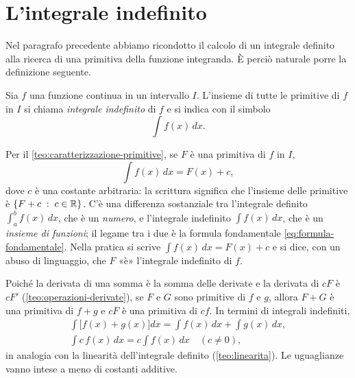 \section{L'integrale indefinito}
\label{sec:integrale-indefinito}

Nel paragrafo precedente abbiamo ricondotto il calcolo di un integrale definito alla
ricerca di una primitiva della funzione integranda. È perciò naturale porre la
definizione seguente.

\begin{definizione}\label{def:integrale-indefinito}
Sia $f$ una funzione continua in un intervallo $I$. L'insieme di tutte le primitive di
$f$ in $I$ si chiama \emph{integrale indefinito} di $f$ e si indica con il simbolo
\begin{equation}\label{eq:integrale-indefinito}
  \int f(x)\,dx .
\end{equation}
\end{definizione}

Per il \cref{teo:caratterizzazione-primitive}, se $F$ è una primitiva di $f$ in $I$,
\begin{equation}\label{eq:integrale-indefinito-c}
  \int f(x)\,dx=F(x)+c ,
\end{equation}
dove $c$ è una costante arbitraria: la scrittura significa che l'insieme delle
primitive è $\left\{ F+c \;:\; c\in\mathbb{R} \right\}$. C'è una differenza sostanziale tra l'integrale
definito $\int_{a}^{b}f(x)\,dx$, che è un \emph{numero}, e l'integrale indefinito $\int f(x)\,dx$,
che è un \emph{insieme di funzioni}; il legame tra i due è la formula fondamentale
\eqref{eq:formula-fondamentale}. Nella pratica si scrive $\int f(x)\,dx=F(x)+c$ e si dice,
con un abuso di linguaggio, che $F$ «è» l'integrale indefinito di $f$.

Poiché la derivata di una somma è la somma delle derivate e la derivata di $cF$ è
$cF'$ (\cref{teo:operazioni-derivate}), se $F$ e $G$ sono primitive di $f$ e $g$, allora
$F+G$ è una primitiva di $f+g$ e $cF$ è una primitiva di $cf$. In termini di integrali
indefiniti,
\begin{equation}\label{eq:linearita-indefinito}
\begin{gathered}
  \int\bigl[f(x)+g(x)\bigr]dx=\int f(x)\,dx+\int g(x)\,dx,\\
  \int c\,f(x)\,dx=c\int f(x)\,dx \quad (c\neq0),
\end{gathered}
\end{equation}
in analogia con la linearità dell'integrale definito (\cref{teo:linearita}). Le
uguaglianze vanno intese a meno di costanti additive.

